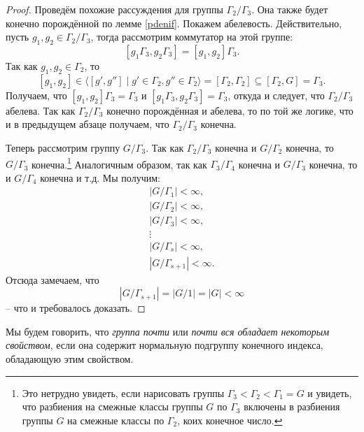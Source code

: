 \documentclass{article}
\begin{document}
\begin{proof}
    Проведём похожие рассуждения для группы $\Gamma_2 / \Gamma_3$. Она также будет конечно порождённой по лемме \ref{pdenif}. Покажем абелевость. Действительно, пусть $g_1, g_2 \in \Gamma_2 / \Gamma_3$, тогда рассмотрим коммутатор на этой группе:
    $$ [g_1 \Gamma_3, g_2 \Gamma_3] = [g_1, g_2] \Gamma_3. $$
    Так как $g_1, g_2 \in \Gamma_2$, то
    $$ [g_1, g_2] \in \langle [g', g''] \mid g' \in \Gamma_2, g'' \in \Gamma_2 \rangle = [\Gamma_2, \Gamma_2] \subseteq [\Gamma_2, G] = \Gamma_3. $$ Получаем, что $[g_1, g_2] \Gamma_3 = \Gamma_3$ и $[g_1 \Gamma_3, g_2 \Gamma_3] = \Gamma_3$, откуда и следует, что $\Gamma_2 / \Gamma_3$ абелева. Так как $\Gamma_2 / \Gamma_3$ конечно порождённая и абелева, то по той же логике, что и в предыдущем абзаце получаем, что $\Gamma_2 / \Gamma_3$ конечна.

    Теперь рассмотрим группу $G / \Gamma_3$. Так как $\Gamma_2 / \Gamma_3$ конечна и $G / \Gamma_2$ конечна, то $G / \Gamma_3$ конечна.\footnote{Это нетрудно увидеть, если нарисовать группы $ \Gamma_3 < \Gamma_2 < \Gamma_1 = G$ и увидеть, что разбиения на смежные классы группы $G$ по $\Gamma_3$ включены в разбиения группы $G$ на смежные классы по $\Gamma_2$, коих конечное число.}
    Аналогичным образом, так как $\Gamma_3 / \Gamma_4$ конечна и $G / \Gamma_3$ конечна, то и $G / \Gamma_4$ конечна и т.д. Мы получим:
    \begin{gather*}
        |G / \Gamma_1| < \infty, \\
        |G / \Gamma_2| < \infty, \\
        |G / \Gamma_3| < \infty, \\
        \vdots \\
        |G / \Gamma_s| < \infty, \\
        |G / \Gamma_{s + 1}| < \infty.
    \end{gather*}
    Отсюда замечаем, что $$ |G / \Gamma_{s + 1}| = |G / 1| = |G| < \infty $$ -- что и требовалось доказать.
\end{proof}

Мы будем говорить, что \textit{группа почти} или \textit{почти вся обладает некоторым свойством}, если она содержит нормальную подгруппу конечного индекса, обладающую этим свойством.
\end{document}
